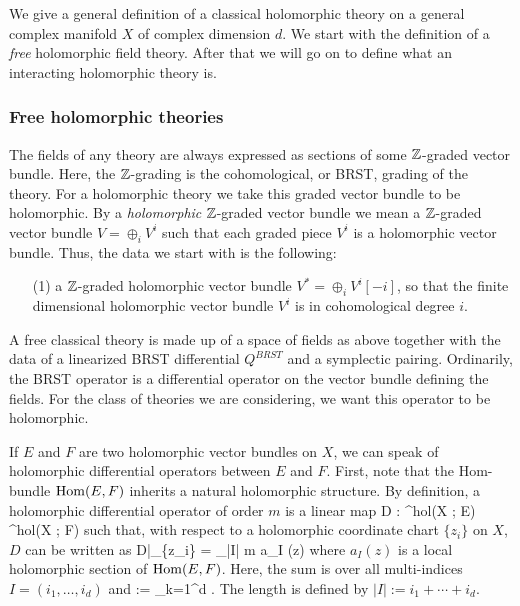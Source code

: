 We give a general definition of a classical holomorphic theory on a general complex manifold $X$ of complex dimension $d$.
We start with the definition of a {\em free} holomorphic field theory. 
After that we will go on to define what an interacting holomorphic theory is.

\subsubsection{Free holomorphic theories}

The fields of any theory are always expressed as sections of some $\mathbb Z$-graded vector bundle.
Here, the $\mathbb Z$-grading is the cohomological, or BRST, grading of the theory.
For a holomorphic theory we take this graded vector bundle to be holomorphic.  
By a {\em holomorphic} $\mathbb Z$-graded vector bundle we mean a $\mathbb Z$-graded vector bundle $
V = \oplus_i V^i$ such that each graded piece $V^i$ is a holomorphic vector bundle. 
Thus, the data we start with is the following:

\begin{itemize}
\item[(1)] a $\mathbb Z$-graded holomorphic vector bundle $V^* = \oplus_i V^i [-i]$, so that the finite dimensional holomorphic vector bundle $V^i$ is in cohomological degree $i$. 
\end{itemize}

A free classical theory is made up of a space of fields as above together with the data of a linearized BRST differential $Q^{BRST}$ and a symplectic pairing. 
Ordinarily, the BRST operator is a differential operator on the vector bundle defining the fields. 
For the class of theories we are considering, we want this operator to be holomorphic. 

If $E$ and $F$ are two holomorphic vector bundles on $X$, we can speak of holomorphic differential operators between $E$ and $F$. 
First, note that the Hom-bundle ${\rm Hom}(E,F)$ inherits a natural holomorphic structure. 
By definition, a holomorphic differential operator of order $m$ is a linear map
\ben
D : \Gamma^{hol}(X ; E) \to \Gamma^{hol}(X ; F)
\een
such that, with respect to a holomorphic coordinate chart $\{z_i\}$ on $X$, $D$ can be written as
\be\label{local holomorphic}
D|_{\{z_i\}} = \sum_{|I| \leq m} a_I (z) 
\ee
where $a_I(z)$ is a local holomorphic section of ${\rm Hom}(E,F)$.
Here, the sum is over all multi-indices $I = (i_1,\ldots, i_d)$ and 
\ben
{} := \prod_{k=1}^d  . 
\een 
The length is defined by $|I| := i_1 + \cdots + i_d$. 

